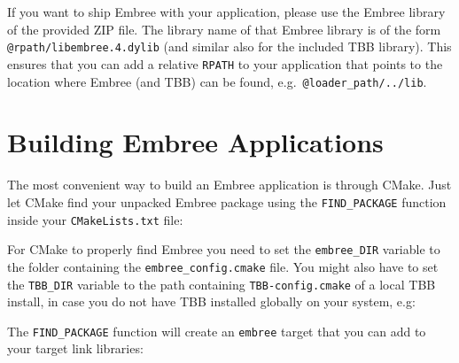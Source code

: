 If you want to ship Embree with your application, please use the Embree
library of the provided ZIP file. The library name of that Embree
library is of the form \texttt{@rpath/libembree.4.dylib} (and similar
also for the included TBB library). This ensures that you can add a
relative \texttt{RPATH} to your application that points to the location
where Embree (and TBB) can be found, e.g.~\texttt{@loader\_path/../lib}.

\section{Building Embree
Applications}\label{building-embree-applications}

The most convenient way to build an Embree application is through CMake.
Just let CMake find your unpacked Embree package using the
\texttt{FIND\_PACKAGE} function inside your \texttt{CMakeLists.txt}
file:

\begin{Shaded}
\begin{Highlighting}[]
\OperatorTok{(}\OperatorTok{)}
\end{Highlighting}
\end{Shaded}

For CMake to properly find Embree you need to set the
\texttt{embree\_DIR} variable to the folder containing the
\texttt{embree\_config.cmake} file. You might also have to set the
\texttt{TBB\_DIR} variable to the path containing
\texttt{TBB-config.cmake} of a local TBB install, in case you do not
have TBB installed globally on your system, e.g:

\begin{Shaded}
\begin{Highlighting}[]
\OperatorTok{{-}}\OperatorTok{=}\OperatorTok{/}\OperatorTok{/}\OperatorTok{/}\OperatorTok{{-}}\OperatorTok{/}\NormalTok{ \textbackslash{}}
      \OperatorTok{{-}}\OperatorTok{=}\OperatorTok{/}\OperatorTok{/}\OperatorTok{/}\OperatorTok{/}\NormalTok{ \textbackslash{}}
\end{Highlighting}
\end{Shaded}

The \texttt{FIND\_PACKAGE} function will create an \texttt{embree}
target that you can add to your target link libraries:

